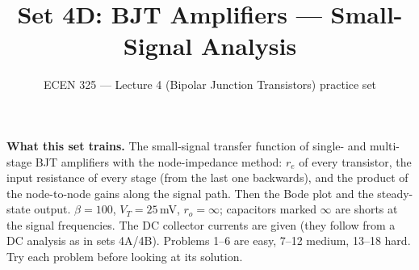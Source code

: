 \documentclass[11pt]{article}
\title{Set 4D: BJT Amplifiers --- Small-Signal Analysis}
\author{ECEN 325 --- Lecture 4 (Bipolar Junction Transistors) practice set}
\date{}
\begin{document}
\maketitle

\textbf{What this set trains.} The small-signal transfer function of single- and multi-stage BJT amplifiers with the
node-impedance method: $r_e$ of every transistor, the input resistance of every stage (from the last one
backwards), and the product of the node-to-node gains along the signal path. Then the Bode plot and the
steady-state output. $\beta = 100$, $V_T = 25$\,mV, $r_o = \infty$; capacitors marked $\infty$ are shorts at the signal
frequencies. The DC collector currents are given (they follow from a DC analysis as in sets 4A/4B). Problems 1--6
are easy, 7--12 medium, 13--18 hard. Try each problem before looking at its solution.
\end{document}
